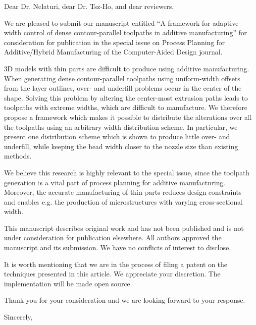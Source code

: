 \documentclass[a4paper,12pt]{letter}
\begin{document}
\begin{letter}{}


\vspace*{-5\baselineskip}%

\opening{
\vspace*{-1\baselineskip}%
Dear  Dr. Nelaturi, dear Dr. Tsz-Ho, and dear reviewers,
}


We are pleased to submit our manuscript entitled ``A framework for adaptive width control of dense contour-parallel toolpaths in additive manufacturing'' for consideration for publication in the special issue on Process Planning for Additive/Hybrid Manufacturing of the Computer-Aided Design journal.

3D models with thin parts are difficult to produce using additive manufacturing.
When generating dense contour-parallel toolpaths using uniform-width offsets from the layer outlines,
over- and underfill problems occur in the center of the shape.
Solving this problem by altering the center-most extrusion paths leads to toolpaths with extreme widths, which are difficult to manufacture.
We therefore propose a framework which makes it possible to distribute the alterations over all the toolpaths using an arbitrary width distribution scheme.
In particular, we present one distribution scheme which is shown to produce little over- and underfill, while keeping the bead width closer to the nozzle size than existing methods.

We believe this research is highly relevant to the special issue, since the toolpath generation is a vital part of process planning for additive manufacturing.
Moreover, the accurate manufacturing of thin parts reduces design constraints and enables e.g. the production of microstructures with varying cross-sectional width.

This manuscript describes original work and has not been published and is not under consideration for publication elsewhere.  All authors approved the manuscript and its submission. We have no conflicts of interest to disclose.

It is worth mentioning that we are in the process of filing a patent on the techniques presented in this article. We appreciate your discretion. The implementation will be made open source. 

Thank you for your consideration and we are looking forward to your response.

\bigskip 

Sincerely,


\end{letter}
\end{document}

